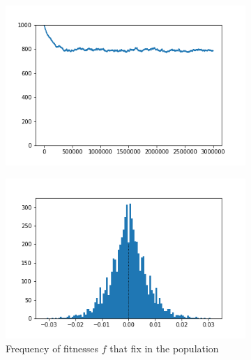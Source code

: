 \documentclass{article}
\begin{document}
\begin{figure}[h]
	\centering
	\begin{subfigure}[t]{0.32\linewidth}
		\centering
		\includegraphics[width = 1.0\linewidth, trim={0 0 0 0}, clip=true]{figures/constant_selection_trajec.png}
		\label{fig:constant_trajec}	
	\end{subfigure}
	\hspace{0.01\linewidth}
	\begin{subfigure}[t]{0.32\linewidth}
		\centering
		\includegraphics[width = 1.0\linewidth, trim={0 0 0 0}, clip=true]{figures/constant_selection_hist2.png}
		\caption{Frequency of fitnesses $f$ that fix in the population}
		\label{fig:constant_hist}
	\end{subfigure}
	\begin{subfigure}[t]{0.32\linewidth}
		\centering

\end{subfigure}
\end{figure}
\end{document}
